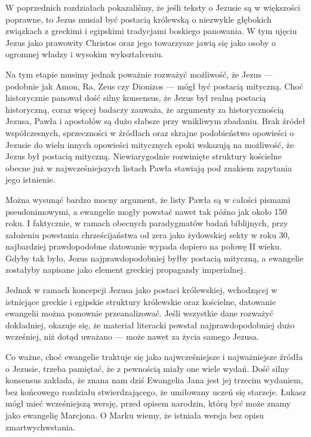W poprzednich rozdziałach pokazaliśmy, że jeśli teksty o Jezusie są w większości poprawne, to Jezus musiał być postacią królewską o niezwykle głębokich związkach z greckimi i egipskimi tradycjami boskiego panowania.
W tym ujęciu Jezus jako prawowity Christos oraz jego towarzysze jawią się jako osoby o ogromnej władzy i wysokim wykształceniu.

Na tym etapie musimy jednak poważnie rozważyć możliwość, że Jezus — podobnie jak Amon, Ra, Zeus czy Dionizos — mógł być postacią mityczną.
Choć historycznie panował dość silny konsensus, że Jezus był realną postacią historyczną, coraz więcej badaczy zauważa, że argumenty za historycznością Jezusa, Pawła i apostołów są dużo słabsze przy wnikliwym zbadaniu.
Brak źródeł współczesnych, sprzeczności w źródłach oraz skrajne podobieństwo opowieści o Jezusie do wielu innych opowieści mitycznych epoki wskazują na możliwość, że Jezus był postacią mityczną.
Niewiarygodnie rozwinięte struktury kościelne obecne już w najwcześniejszych listach Pawła stawiają pod znakiem zapytania jego istnienie.

Można wysunąć bardzo mocny argument, że listy Pawła są w całości pismami pseudonimowymi, a ewangelie mogły powstać nawet tak późno jak około 150 roku.
I faktycznie, w ramach obecnych paradygmatów badań biblijnych, przy założeniu powstania chrześcijaństwa od zera jako żydowskiej sekty w roku 30, najbardziej prawdopodobne datowanie wypada dopiero na połowę II wieku.
Gdyby tak było, Jezus najprawdopodobniej byłby postacią mityczną, a ewangelie zostałyby napisane jako element greckiej propagandy imperialnej.

Jednak w ramach koncepcji Jezusa jako postaci królewskiej, wchodzącej w istniejące greckie i egipskie struktury królewskie oraz kościelne, datowanie ewangelii można ponownie przeanalizować.
Jeśli wszystkie dane rozważyć dokładniej, okazuje się, że materiał literacki powstał najprawdopodobniej dużo wcześniej, niż dotąd uważano — może nawet za życia samego Jezusa.

Co ważne, choć ewangelie traktuje się jako najwcześniejsze i najważniejsze źródła o Jezusie, trzeba pamiętać, że z pewnością miały one wiele wydań.
Dość silny konsensus zakłada, że znana nam dziś Ewangelia Jana jest jej trzecim wydaniem, bez końcowego rozdziału stwierdzającego, że umiłowany uczeń się starzeje.
Łukasz mógł mieć wcześniejszą wersję, przed opisem narodzin, którą być może znamy jako ewangelię Marcjona.
O Marku wiemy, że istniała wersja bez opisu zmartwychwstania.

